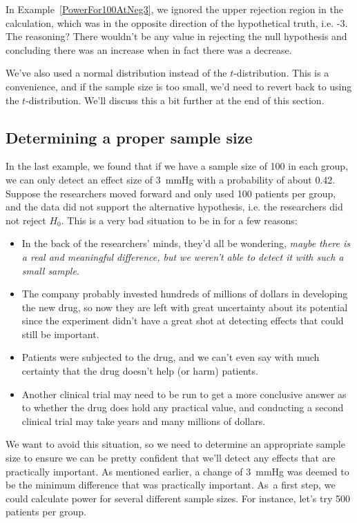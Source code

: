 In Example~\ref{PowerFor100AtNeg3}, we ignored the upper
rejection region in the calculation, which was in the
opposite direction of the hypothetical truth, i.e. -3.
The reasoning?
There wouldn't be any value in rejecting the null hypothesis
and concluding there was an increase when in fact there was
a decrease.

We've also used a normal distribution instead
of the $t$-distribution.
This is a convenience, and if the sample size is too small,
we'd need to revert back to using the $t$-distribution.
We'll discuss this a bit further at the end of this section.



\subsection{Determining a proper sample size}

In the last example, we found that if we have a sample size
of 100 in each group, we can only detect an effect size of
3~mmHg with a probability of about 0.42.
Suppose the researchers moved forward and only used
100 patients per group, and the data did not support
the alternative hypothesis,
i.e. the researchers did not reject $H_0$.
This is a very bad situation to be in for a few reasons:
\begin{itemize}
\setlength{\itemsep}{0mm}
\item
    In the back of the researchers' minds, they'd all be
    wondering, \emph{maybe there is a real and meaningful
    difference, but we weren't able to detect it with such
    a small sample}. 
\item
    The company probably invested hundreds of millions
    of dollars in developing the new drug, so now they
    are left with great uncertainty about its potential
    since the experiment didn't have a great shot at
    detecting effects that could still be important.
\item
    Patients were subjected to the drug, and we can't even
    say with much certainty that the drug doesn't help
    (or harm) patients.
\item
    Another clinical trial may need to be run to get a more
    conclusive answer as to whether the drug does hold any
    practical value, and conducting a second clinical trial
    may take years and many millions of dollars.
\end{itemize}
We want to avoid this situation, so we need to determine
an appropriate sample size to ensure we can be pretty
confident that we'll detect any effects that are practically
important.
As mentioned earlier, a change of 3~mmHg was deemed to be the
minimum difference that was practically important.
As~a first step, we could calculate power for several
different sample sizes.
For instance, let's try 500 patients per group.

